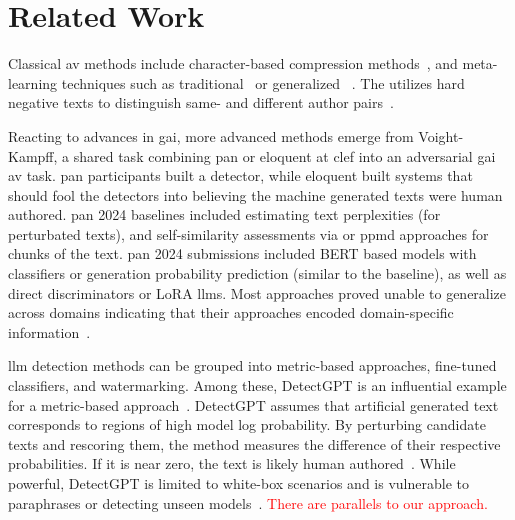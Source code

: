 \chapter{Related Work}
\label{chap:related_work}




Classical \ac{av} methods include character-based compression methods~\citep{tyo_state_2022,neal_surveying_2018}, and meta-learning techniques such as traditional~\citep{koppel_authorship_2004,koppel_authorship_2011} or generalized \unmasking{}~\citep{bevendorff_generalizing_2019,bevendorff_divergence_based_2020}.
The \impAppr{} utilizes hard negative texts to distinguish same- and different author pairs~\citep{koppel_determining_2014}.

Reacting to advances in \ac{gai}, more advanced methods emerge from Voight-Kampff, a shared task combining \acs{pan} or \ac{eloquent} at \ac{clef} into an adversarial \ac{gai} \ac{av} task.
\acs{pan} participants built a detector, while \ac{eloquent} built systems that should fool the detectors into believing the machine generated texts were human authored.
\acs{pan} 2024 baselines included estimating text perplexities (for perturbated texts), and self-similarity assessments via \unmasking{} or \ac{ppmd} approaches for chunks of the text.
\acs{pan} 2024 submissions included BERT based models with classifiers or generation probability prediction (similar to the baseline), as well as direct discriminators or LoRA \acp{llm}.
Most approaches proved unable to generalize across domains indicating that their approaches encoded domain-specific information~\citep{bevendorff_overview_2024}.

\Ac{llm} detection methods can be grouped into metric-based approaches, fine-tuned classifiers, and watermarking. 
Among these, DetectGPT is an influential example for a metric-based approach~\citep{wang_stumbling_2024}.
DetectGPT assumes that artificial generated text corresponds to regions of high model log probability. 
By perturbing candidate texts and rescoring them, the method measures the difference of their respective probabilities.
If it is near zero, the text is likely human authored~\citep{mitchell_detectgpt_2023}. 
While powerful, DetectGPT is limited to white-box scenarios %
and is vulnerable to paraphrases or detecting unseen models~\citep{Wu_ODD_challenges_2025}.
\textcolor{red}{There are parallels to our approach.}

